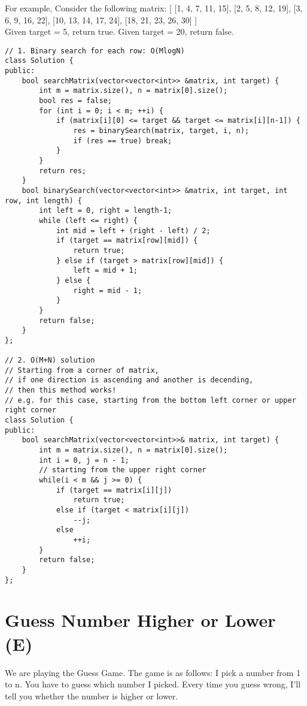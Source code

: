 For example,
Consider the following matrix:
[
  [1,   4,  7, 11, 15],
  [2,   5,  8, 12, 19],
  [3,   6,  9, 16, 22],
  [10, 13, 14, 17, 24],
  [18, 21, 23, 26, 30]
]\\
Given target = 5, return true. Given target = 20, return false.\\

\begin{lstlisting}
// 1. Binary search for each row: O(MlogN)
class Solution {
public:
    bool searchMatrix(vector<vector<int>> &matrix, int target) {
        int m = matrix.size(), n = matrix[0].size();
        bool res = false;
        for (int i = 0; i < m; ++i) {
            if (matrix[i][0] <= target && target <= matrix[i][n-1]) {
                res = binarySearch(matrix, target, i, n);
                if (res == true) break;
            }
        }
        return res;
    }
    bool binarySearch(vector<vector<int>> &matrix, int target, int row, int length) {
        int left = 0, right = length-1;
        while (left <= right) {
            int mid = left + (right - left) / 2;
            if (target == matrix[row][mid]) {
                return true;
            } else if (target > matrix[row][mid]) {
                left = mid + 1;
            } else {
                right = mid - 1;
            }
        }
        return false;
    }
};

// 2. O(M+N) solution
// Starting from a corner of matrix, 
// if one direction is ascending and another is decending,
// then this method works!
// e.g. for this case, starting from the bottom left corner or upper right corner
class Solution {
public:
    bool searchMatrix(vector<vector<int>>& matrix, int target) {
        int m = matrix.size(), n = matrix[0].size();
        int i = 0, j = n - 1;
        // starting from the upper right corner
        while(i < m && j >= 0) {
            if (target == matrix[i][j])
                return true;
            else if (target < matrix[i][j])
                --j;
            else
                ++i;
        }
        return false;
    }
};
\end{lstlisting}

\section{Guess Number Higher or Lower (E)}
We are playing the Guess Game. The game is as follows: I pick a number from 1 to n. You have to guess which number I picked. Every time you guess wrong, I'll tell you whether the number is higher or lower.\\

